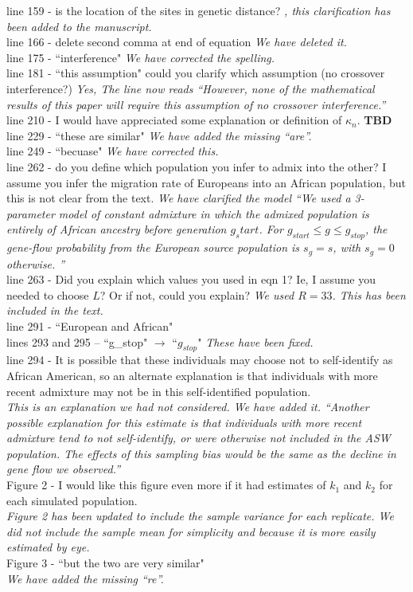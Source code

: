 \documentclass[11pt]{amsart}
\begin{document}
line 159 - is the location of the sites in genetic distance? \textit{, this clarification has been added to the manuscript.}\\
line 166 - delete second comma at end of equation \textit{We have deleted it.}\\
line 175 - ``interference" \textit{We have corrected the spelling.}\\
line 181 - ``this assumption" could you clarify which assumption (no crossover interference?) \textit{Yes, The line now reads ``However, none of the mathematical results of this paper will require this assumption of no crossover interference.''}\\
line 210 - I would have appreciated some explanation or definition of $\kappa_n$. \textbf{TBD}\\
line 229 - ``these are similar" \textit{We have added the missing ``are''.}\\
line 249 - ``becuase" \textit{We have corrected this.}\\
line 262 - do you define which population you infer to admix into the other? I assume you infer the migration rate of Europeans into an African population, but this is not clear from the text.
\textit{We have clarified the model ``We used a 3-parameter model of constant admixture in which the admixed population is entirely of African ancestry before generation $g_start$. For $g_{start}\leq g\leq g_{stop}$, the gene-flow probability from the European source population is $s_g=s$, with $s_g=0$ otherwise. ''}\\ 
line 263 - Did you explain which values you used in eqn 1? Ie, I assume you needed to choose $L$? Or if not, could you explain? \textit{We used $R=33$. This has been included in the text.}\\
line 291 - ``European and African" \\
lines 293 and 295 – ``g\_stop" $\rightarrow$ ``$g_{stop}$" \textit{These have been fixed.}\\ 
line 294 - It is possible that these individuals may choose not to self-identify as African American, so an alternate explanation is that individuals with more recent admixture may not be in this self-identified population. \\
\textit{This is an explanation we had not considered. We have added it. ``Another possible explanation for this estimate is that individuals with more recent admixture tend to not self-identify, or were otherwise not included in the ASW population. The effects of this sampling bias would be the same as the decline in gene flow we observed.''}\\
Figure 2 - I would like this figure even more if it had estimates of $k_1$ and $k_2$ for each 
simulated population.\\
\textit{Figure 2 has been updated to include the sample variance for each replicate. We did not include the sample mean for simplicity and because it is more easily estimated by eye.}\\
Figure 3 - ``but the two are very similar"\\
\textit{We have added the missing ``re''.}
\end{document}
